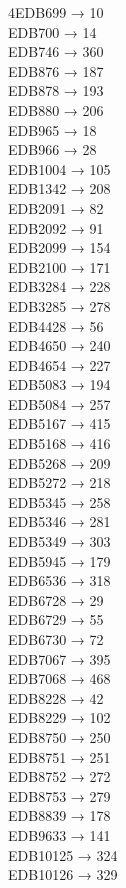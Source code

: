 \begin{multicols}{4}\footnotesize\noindent EDB699 → 10\\
EDB700 → 14\\
EDB746 → 360\\
EDB876 → 187\\
EDB878 → 193\\
EDB880 → 206\\
EDB965 → 18\\
EDB966 → 28\\
EDB1004 → 105\\
EDB1342 → 208\\
EDB2091 → 82\\
EDB2092 → 91\\
EDB2099 → 154\\
EDB2100 → 171\\
EDB3284 → 228\\
EDB3285 → 278\\
EDB4428 → 56\\
EDB4650 → 240\\
EDB4654 → 227\\
EDB5083 → 194\\
EDB5084 → 257\\
EDB5167 → 415\\
EDB5168 → 416\\
EDB5268 → 209\\
EDB5272 → 218\\
EDB5345 → 258\\
EDB5346 → 281\\
EDB5349 → 303\\
EDB5945 → 179\\
EDB6536 → 318\\
EDB6728 → 29\\
EDB6729 → 55\\
EDB6730 → 72\\
EDB7067 → 395\\
EDB7068 → 468\\
EDB8228 → 42\\
EDB8229 → 102\\
EDB8750 → 250\\
EDB8751 → 251\\
EDB8752 → 272\\
EDB8753 → 279\\
EDB8839 → 178\\
EDB9633 → 141\\
EDB10125 → 324\\
EDB10126 → 329\\

\end{multicols}
